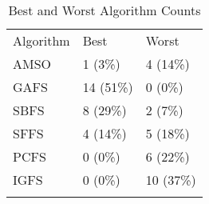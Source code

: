 \begin{table}
\caption{Best and Worst Algorithm Counts}
\label{tbl:best:worst:count}
\begin{tabular}{lll}
\noalign{\smallskip}\hline\noalign{\smallskip}
Algorithm&Best&Worst\\
\noalign{\smallskip}\hline
AMSO&1 (3\%)&4 (14\%)\\
GAFS&14 (51\%)&0 (0\%)\\
SBFS&8 (29\%)&2 (7\%)\\
SFFS&4 (14\%)&5 (18\%)\\
PCFS&0 (0\%)&6 (22\%)\\
IGFS&0 (0\%)&10 (37\%)\\
\noalign{\smallskip}\hline
\end{tabular}
\end{table}
